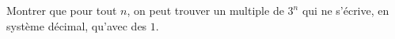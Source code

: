 Montrer que pour tout $n$, on peut trouver un multiple de $3^n$ qui ne s'écrive, en système décimal, qu'avec des $1$.
